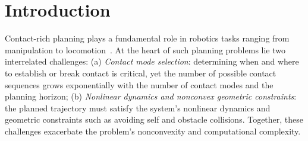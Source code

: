 
\section{Introduction}
\label{sec:introduction}
\vspace{-1mm}

Contact-rich planning plays a fundamental role in robotics tasks ranging from manipulation to locomotion~\cite{mason1986ijrr-mechanics-planning-pushing,di2018iros-dynamic-locomotion,hirai1998icra-development-honda-humanoid}. At the heart of such planning problems lie two interrelated challenges: (a) \textit{Contact mode selection}: determining when and where to establish or break contact is critical, yet the number of possible contact sequences grows exponentially with the number of contact modes and the planning horizon; (b) \textit{Nonlinear dynamics and nonconvex geometric constraints}: the planned trajectory must satisfy the system's nonlinear dynamics and geometric constraints such as avoiding self and obstacle collisions. Together, these challenges exacerbate the problem's nonconvexity and computational complexity.

